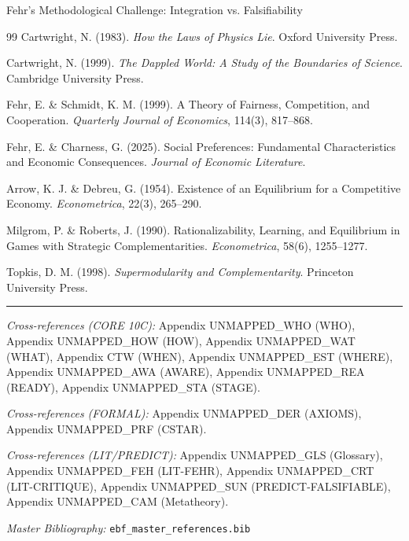 \begin{chapter}{Fehr's Methodological Challenge: Integration vs. Falsifiability}
\begin{thebibliography}{99}
 Cartwright, N. (1983). \textit{How the Laws of Physics Lie}. Oxford University Press.

 Cartwright, N. (1999). \textit{The Dappled World: A Study of the Boundaries of Science}. Cambridge University Press.

 Fehr, E. \& Schmidt, K. M. (1999). A Theory of Fairness, Competition, and Cooperation. \textit{Quarterly Journal of Economics}, 114(3), 817--868.

 Fehr, E. \& Charness, G. (2025). Social Preferences: Fundamental Characteristics and Economic Consequences. \textit{Journal of Economic Literature}.

 Arrow, K. J. \& Debreu, G. (1954). Existence of an Equilibrium for a Competitive Economy. \textit{Econometrica}, 22(3), 265--290.

 Milgrom, P. \& Roberts, J. (1990). Rationalizability, Learning, and Equilibrium in Games with Strategic Complementarities. \textit{Econometrica}, 58(6), 1255--1277.

 Topkis, D. M. (1998). \textit{Supermodularity and Complementarity}. Princeton University Press.

\end{thebibliography}


\vspace{1em}
\hrule
\vspace{0.5em}

\noindent\textit{Cross-references (CORE 10C):}
Appendix UNMAPPED_WHO (WHO),
Appendix UNMAPPED_HOW (HOW),
Appendix UNMAPPED_WAT (WHAT),
Appendix CTW (WHEN),
Appendix UNMAPPED_EST (WHERE),
Appendix UNMAPPED_AWA (AWARE),
Appendix UNMAPPED_REA (READY),
Appendix UNMAPPED_STA (STAGE).

\noindent\textit{Cross-references (FORMAL):}
Appendix UNMAPPED_DER (AXIOMS),
Appendix UNMAPPED_PRF (CSTAR).

\noindent\textit{Cross-references (LIT/PREDICT):}
Appendix UNMAPPED_GLS (Glossary),
Appendix UNMAPPED_FEH (LIT-FEHR),
Appendix UNMAPPED_CRT (LIT-CRITIQUE),
Appendix UNMAPPED_SUN (PREDICT-FALSIFIABLE),
Appendix UNMAPPED_CAM (Metatheory).

\noindent\textit{Master Bibliography:} \texttt{ebf\_master\_references.bib}

\nocite{bcm_master}

\end{chapter}

